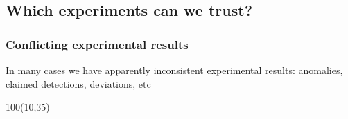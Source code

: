 \documentclass[xcolor=dvipsnames]{beamer}
\begin{document}
\subsection{Which experiments can we trust?}

\begin{frame}
\frametitle{Conflicting experimental results}
In many cases we have apparently inconsistent experimental results: anomalies, claimed detections, deviations, etc\vspace{5mm}

\begin{textblock}{100}(10,35)
\end{textblock}


\end{frame}
\end{document}
